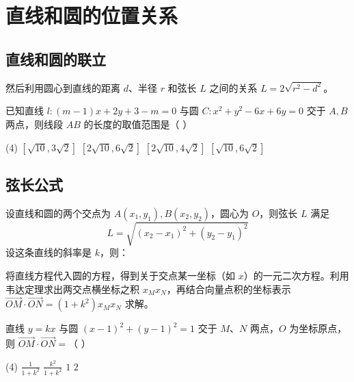 \section{直线和圆的位置关系}

\subsection{直线和圆的联立}

\begin{theorem}[直线与圆的交点的弦长]
    然后利用圆心到直线的距离 $d$、半径 $r$ 和弦长 $L$ 之间的关系 $L=2\sqrt{r^2-d^2}$。
\end{theorem}

\begin{example}
    已知直线 $l:(m-1) x+2 y+3-m=0$ 与圆 $C: x^2+y^2-6 x+6 y=0$ 交于 $A, B$ 两点，则线段 $A B$ 的长度的取值范围是（ \hspace{2em} ）
    \begin{tasks}(4)
        \task $[\sqrt{10}, 3 \sqrt{2}]$
        \task $[2 \sqrt{10}, 6 \sqrt{2}]$
        \task $[2 \sqrt{10}, 4 \sqrt{2}]$
        \task $[\sqrt{10}, 6 \sqrt{2}]$
    \end{tasks}
\end{example}

\vspace{4em}

\subsection{弦长公式}

\begin{theorem}[弦长公式]
    设直线和圆的两个交点为 $A(x_1, y_1), B(x_2, y_2)$，圆心为 $O$，则弦长 $L$ 满足
    \[
        L = \sqrt{(x_2 - x_1)^2 + (y_2 - y_1)^2}
    \]
    设这条直线的斜率是 $k$，则：

\end{theorem}

\begin{theorem}[直线与圆的交点及韦达定理]
    将直线方程代入圆的方程，得到关于交点某一坐标（如 $x$）的一元二次方程。利用韦达定理求出两交点横坐标之积 $x_M x_N$，再结合向量点积的坐标表示 $\overrightarrow{O M} \cdot \overrightarrow{O N} = (1+k^2)x_M x_N$ 求解。
\end{theorem}
\begin{example}
    直线 $y=k x$ 与圆 $(x-1)^2+(y-1)^2=1$ 交于 $M 、 N$ 两点，$O$ 为坐标原点，则 $\overrightarrow{O M} \cdot \overrightarrow{O N}=$（ \hspace{2em} ）
    \begin{tasks}(4)
        \task $\frac{1}{1+k^2}$
        \task $\frac{k^2}{1+k^2}$
        \task $1$
        \task $2$
    \end{tasks}
\end{example}

